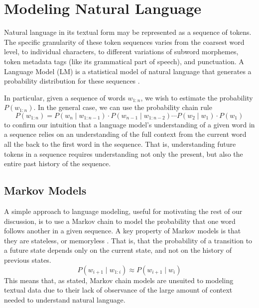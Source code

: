 \section{Modeling Natural Language}\label{sec:introduction:language-models}

Natural language in its textual form may be represented as a sequence of tokens.
The specific granularity of these token sequences varies from the coarsest word level, to individual characters, to different variations of subword morphemes, token metadata tags (like its grammatical part of speech), and punctuation.
A Language Model (LM) is a statistical model of natural language that generates a probability distribution for these sequences \cite{pappas_meyer_2012,goldberg_2017}.

In particular, given a sequence of words $w_{1:n}$, we wish to estimate the probability $P(w_{1:n})$.
In the general case, we can use the probability chain rule
\begin{equation}
    P(w_{1:n}) = P(w_n \mid w_{1:n - 1}) \cdot P(w_{n - 1} \mid w_{1:n - 2}) \cdots P(w_2 \mid w_1) \cdot P(w_1)\label{eq:language-models:chain-rule}
\end{equation}
to confirm our intuition that a language model's understanding of a given word in a sequence relies on an understanding of the full context from the current word all the back to the first word in the sequence.
That is, understanding future tokens in a sequence requires understanding not only the present, but also the entire past history of the sequence.


\subsection{Markov Models}\label{sec:language-models:markov}

A simple approach to language modeling, useful for motivating the rest of our discussion, is to use a Markov chain to model the probability that one word follows another in a given sequence.
A key property of Markov models is that they are stateless, or memoryless \cite{gagniuc_2017}.
That is, that the probability of a transition to a future state depends only on the current state, and not on the history of previous states.
\begin{equation}
    P(w_{i + 1} \mid w_{1:i}) \approx P(w_{i+1} \mid w_i) \label{eq:language-models:markov-chain}
\end{equation}
This means that, as stated, Markov chain models are unsuited to modeling textual data due to their lack of observance of the large amount of context needed to understand natural language.

